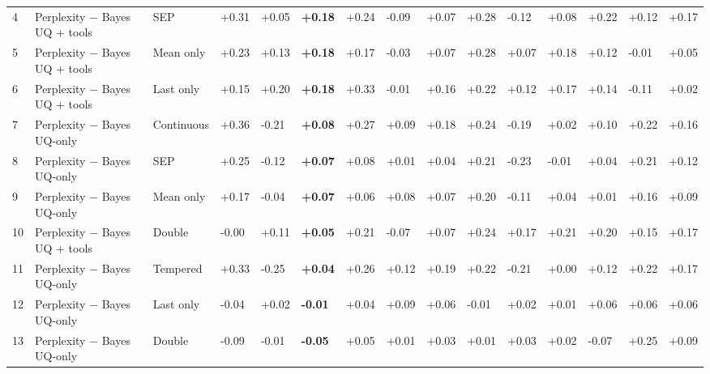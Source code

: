 \documentclass[10pt,a4paper]{article}
\begin{document}
\begin{longtable}{@{}R{8.000mm}L{38.000mm}L{30.000mm}C{14.000mm}C{14.000mm}C{14.000mm}C{14.000mm}C{14.000mm}C{14.000mm}C{14.000mm}C{14.000mm}C{14.000mm}C{14.000mm}C{14.000mm}C{14.000mm}@{}}
4 & Perplexity \ensuremath{-} Bayes UQ + tools & SEP & +0.31 & +0.05 & \textbf{+0.18} & +0.24 & -0.09 & +0.07 & +0.28 & -0.12 & +0.08 & +0.22 & +0.12 & +0.17 \\
5 & Perplexity \ensuremath{-} Bayes UQ + tools & Mean only & +0.23 & +0.13 & \textbf{+0.18} & +0.17 & -0.03 & +0.07 & +0.28 & +0.07 & +0.18 & +0.12 & -0.01 & +0.05 \\
6 & Perplexity \ensuremath{-} Bayes UQ + tools & Last only & +0.15 & +0.20 & \textbf{+0.18} & +0.33 & -0.01 & +0.16 & +0.22 & +0.12 & +0.17 & +0.14 & -0.11 & +0.02 \\
7 & Perplexity \ensuremath{-} Bayes UQ-only & Continuous & +0.36 & -0.21 & \textbf{+0.08} & +0.27 & +0.09 & +0.18 & +0.24 & -0.19 & +0.02 & +0.10 & +0.22 & +0.16 \\
8 & Perplexity \ensuremath{-} Bayes UQ-only & SEP & +0.25 & -0.12 & \textbf{+0.07} & +0.08 & +0.01 & +0.04 & +0.21 & -0.23 & -0.01 & +0.04 & +0.21 & +0.12 \\
9 & Perplexity \ensuremath{-} Bayes UQ-only & Mean only & +0.17 & -0.04 & \textbf{+0.07} & +0.06 & +0.08 & +0.07 & +0.20 & -0.11 & +0.04 & +0.01 & +0.16 & +0.09 \\
10 & Perplexity \ensuremath{-} Bayes UQ + tools & Double & -0.00 & +0.11 & \textbf{+0.05} & +0.21 & -0.07 & +0.07 & +0.24 & +0.17 & +0.21 & +0.20 & +0.15 & +0.17 \\
11 & Perplexity \ensuremath{-} Bayes UQ-only & Tempered & +0.33 & -0.25 & \textbf{+0.04} & +0.26 & +0.12 & +0.19 & +0.22 & -0.21 & +0.00 & +0.12 & +0.22 & +0.17 \\
12 & Perplexity \ensuremath{-} Bayes UQ-only & Last only & -0.04 & +0.02 & \textbf{-0.01} & +0.04 & +0.09 & +0.06 & -0.01 & +0.02 & +0.01 & +0.06 & +0.06 & +0.06 \\
13 & Perplexity \ensuremath{-} Bayes UQ-only & Double & -0.09 & -0.01 & \textbf{-0.05} & +0.05 & +0.01 & +0.03 & +0.01 & +0.03 & +0.02 & -0.07 & +0.25 & +0.09 \\
\end{longtable}
\endgroup
\Needspace{40mm}
\Needspace{40mm}
\end{document}
